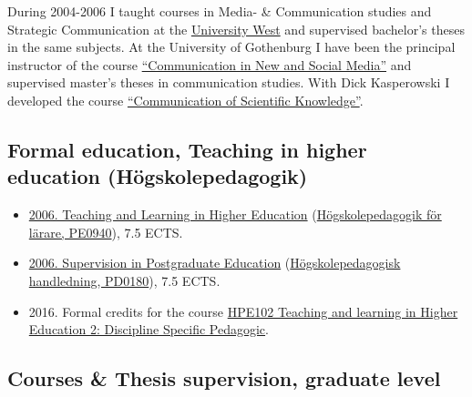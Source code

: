\documentclass[a4paper,11pt,oneside]{article}
\begin{document}
{  During 2004-2006 I taught courses in Media- \& Communication studies and Strategic Communication
  at the \href{http://files.christopherkullenberg.se/universitywest.pdf}{University West} and supervised bachelor's theses in the same subjects.
  At the University of Gothenburg I have been the principal instructor of the course
  \href{http://files.christopherkullenberg.se/kursplaner/KT2102.pdf}{``Communication in New and Social Media''} and supervised master's theses in communication studies.
  With Dick Kasperowski I developed the course \href{http://files.christopherkullenberg.se/kursplaner/KT2110.pdf}{``Communication of Scientific Knowledge''}.\\



    \subsection{Formal education, Teaching in higher education (Högskolepedagogik)}
    \begin{itemize}
      \item \href{http://files.christopherkullenberg.se/hogskolepedagogikonline.pdf}{2006. Teaching and Learning in Higher Education} (\href{http://files.christopherkullenberg.se/PE0940.pdf}{Högskolepedagogik för lärare, PE0940}), 7.5 ECTS.
      \item \href{http://files.christopherkullenberg.se/hogskolepedagogikonline.pdf}{2006. Supervision in Postgraduate Education} (\href{http://files.christopherkullenberg.se/PD0180.pdf}{Högskolepedagogisk handledning, PD0180}), 7.5 ECTS.
      \item 2016. Formal credits for the course \href{http://kursplaner.gu.se/svenska/HPE102.pdf}{HPE102 Teaching and learning in Higher Education 2: Discipline Specific Pedagogic}.
    \end{itemize}


    \subsection{Courses \& Thesis supervision, graduate level}

}
\end{document}
